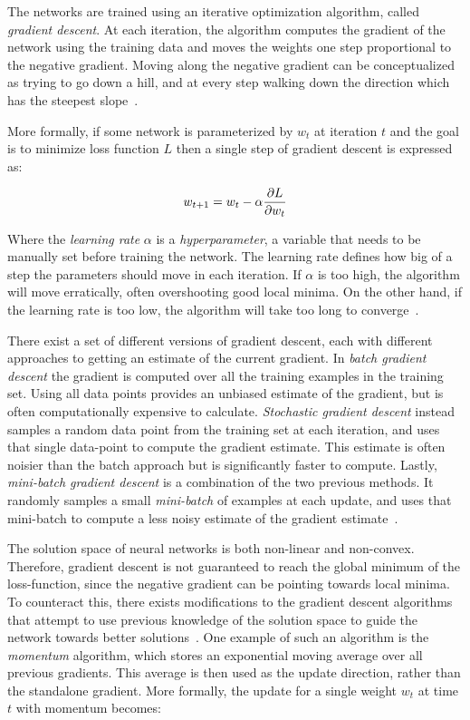 The networks are trained using an iterative optimization algorithm, called \textit{gradient descent}. At each iteration, the algorithm computes the gradient of the network using the training data and moves the weights one step proportional to the negative gradient. Moving along the negative gradient can be conceptualized as trying to go down a hill, and at every step walking down the direction which has the steepest slope~\cite{deeplearningbook}.

More formally, if some network is parameterized by $w_t$ at iteration $t$ and the goal is to minimize loss function $L$ then a single step of gradient descent is expressed as:

\begin{equation}
    w_{t+1} = w_{t} - \alpha \frac{\partial L}{\partial w_t}
\end{equation}

Where the \textit{learning rate} $\alpha$ is a \textit{hyperparameter}, a variable that needs to be manually set before training the network. The learning rate defines how big of a step the parameters should move in each iteration. If $\alpha$ is too high, the algorithm will move erratically, often overshooting good local minima. On the other hand, if the learning rate is too low, the algorithm will take too long to converge~\cite{deeplearningbook}.

There exist a set of different versions of gradient descent, each with different approaches to getting an estimate of the current gradient. In \textit{batch gradient descent} the gradient is computed over all the training examples in the training set. Using all data points provides an unbiased estimate of the gradient, but is often computationally expensive to calculate. \textit{Stochastic gradient descent} instead samples a random data point from the training set at each iteration, and uses that single data-point to compute the gradient estimate. This estimate is often noisier than the batch approach but is significantly faster to compute. Lastly, \textit{mini-batch gradient descent} is a combination of the two previous methods. It randomly samples a small \textit{mini-batch} of examples at each update, and uses that mini-batch to compute a less noisy estimate of the gradient estimate~\cite{deeplearningbook}.

The solution space of neural networks is both non-linear and non-convex. Therefore, gradient descent is not guaranteed to reach the global minimum of the loss-function, since the negative gradient can be pointing towards local minima. To counteract this, there exists modifications to the gradient descent algorithms that attempt to use previous knowledge of the solution space to guide the network towards better solutions~\cite{deeplearningbook}. One example of such an algorithm is the \textit{momentum} algorithm, which stores an exponential moving average over all previous gradients. This average is then used as the update direction, rather than the standalone gradient. More formally, the update for a single weight $w_t$ at time $t$ with momentum becomes:

